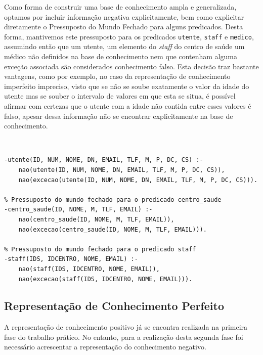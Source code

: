 \documentclass[a4paper, 11pt]{article}
\begin{document}
Como forma de construir uma base de conhecimento ampla e generalizada,
optamos por incluir informação negativa explicitamente, bem como explicitar diretamente o
Pressuposto do Mundo Fechado para alguns predicados. Desta forma, mantivemos este pressuposto
para os predicados \texttt{utente}, \texttt{staff} e \texttt{medico}, assumindo então que um 
utente, um elemento do \textit{staff} do centro de saúde 
um médico não definidos na base de conhecimento nem que contenham alguma exceção
associada são considerados conhecimento falso. Esta decisão traz bastante vantagens, como
por exemplo, no caso da representação de conhecimento imperfeito impreciso, visto que se
não se soube exatamente o valor da idade do utente mas se souber o intervalo de
valores em que esta se situa, é possível afirmar com certezas que o utente com a idade não 
contida entre esses valores é falso, apesar dessa informação não se encontrar
explicitamente na base de conhecimento.


\

\begin{lstlisting}[caption={Pressuposto do Mundo Fechado para os predicados \texttt{utente}, 
\texttt{centro\_saude} e \texttt{staff}}]
% Pressuposto do mundo fechado para o predicado utente
-utente(ID, NUM, NOME, DN, EMAIL, TLF, M, P, DC, CS) :-
    nao(utente(ID, NUM, NOME, DN, EMAIL, TLF, M, P, DC, CS)),
    nao(excecao(utente(ID, NUM, NOME, DN, EMAIL, TLF, M, P, DC, CS))).

% Pressuposto do mundo fechado para o predicado centro_saude
-centro_saude(ID, NOME, M, TLF, EMAIL) :-
    nao(centro_saude(ID, NOME, M, TLF, EMAIL)),
    nao(excecao(centro_saude(ID, NOME, M, TLF, EMAIL))).

% Pressuposto do mundo fechado para o predicado staff
-staff(IDS, IDCENTRO, NOME, EMAIL) :-
    nao(staff(IDS, IDCENTRO, NOME, EMAIL)),
    nao(excecao(staff(IDS, IDCENTRO, NOME, EMAIL))).
\end{lstlisting}


\pagebreak

\subsection{Representação de Conhecimento Perfeito}

A representação de conhecimento positivo já se encontra realizada na primeira fase do trabalho 
prático. No
entanto, para a realização desta segunda fase foi necessário acrescentar a
representação do conhecimento negativo.
\end{document}
